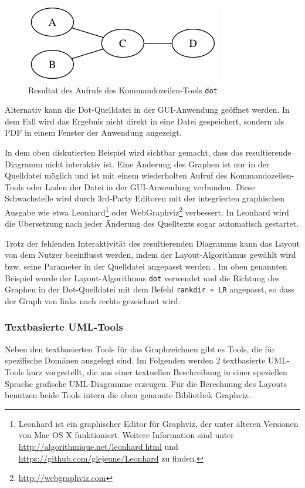 \begin{figure}[hbt]
    \centering
    \includegraphics[scale=0.75]{resources/graphviz-dot-example.png}
    \caption{Resultat des Aufrufs des Kommandozeilen-Tools \lstinline{dot}}
    \label{fig:graphviz-dot-example}
\end{figure}

Alternativ kann die Dot-Quelldatei in der GUI-Anwendung geöffnet werden. In dem Fall wird das Ergebnis nicht direkt in eine Datei gespeichert, sondern als PDF in einem Fenster der Anwendung angezeigt.

In dem oben diskutierten Beispiel wird sichtbar gemacht, dass das resultierende Diagramm nicht interaktiv ist. Eine Änderung des Graphen ist nur in der Quelldatei möglich und ist mit einem wiederholten Aufruf des Kommandozeilen-Tools oder Laden der Datei in der GUI-Anwendung verbunden. Diese Schwachstelle wird durch 3rd-Party Editoren mit der integrierten graphischen Ausgabe wie etwa Leonhard\footnote{Leonhard ist ein graphischer Editor für Graphviz, der unter älteren Versionen von Mac OS X funktioniert. Weitere Information sind unter \url{http://algorithmique.net/leonhard.html} und \url{https://github.com/glejeune/Leonhard} zu finden.} oder WebGraphviz\footnote{\url{http://webgraphviz.com}} verbessert. In Leonhard wird die Übersetzung nach jeder Änderung des Quelltexts sogar automatisch gestartet.

Trotz der fehlenden Interaktivität des resultierenden Diagramms kann das Layout von dem Nutzer beeinflusst werden, indem der Layout-Algorithmus gewählt wird bzw. seine Parameter in der Quelldatei angepasst werden \cite{NorthGansner14Dot-Manual}. Im oben genannten Beispiel wurde der Layout-Algorithmus \lstinline{dot} verwendet und die Richtung des Graphen in der Dot-Quelldatei mit dem Befehl \lstinline{rankdir = LR} angepasst, so dass der Graph von links nach rechts gezeichnet wird.

\subsubsection{Textbasierte UML-Tools}

Neben den textbasierten Tools für das Graphzeichnen gibt es Tools, die für spezifische Domänen ausgelegt sind. Im Folgenden werden 2 textbasierte UML-Tools kurz vorgestellt, die aus einer textuellen Beschreibung in einer speziellen Sprache grafische UML-Diagramme erzeugen. Für die Berechnung des Layouts benutzen beide Tools intern die oben genannte Bibliothek Graphviz.

